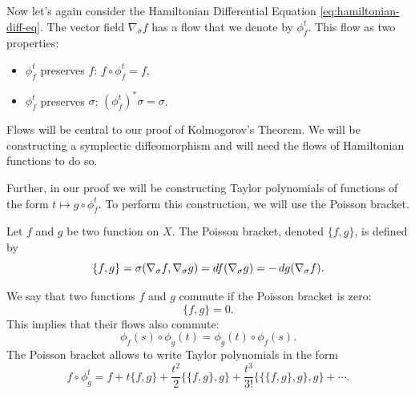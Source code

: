 \documentclass[twoside,letterpaper,10pt]{article}
\newcommand{\sgrad}{\nabla_{\sigma}}
\begin{document}
Now let's again consider the Hamiltonian Differential Equation
\cref{eq:hamiltonian-diff-eq}.
The vector field $\sgrad f$ has a flow that we denote by $\phi_f^t$.
This flow as two properties:
\begin{itemize}
\item $\phi_f^t$ preserves $f$: $f \circ \phi_f^t = f$,
\item $\phi_f^t$ preserves $\sigma$: $(\phi_f^t)^* \sigma = \sigma$.
\end{itemize}
Flows will be central to our proof of Kolmogorov's Theorem.
We will be constructing a symplectic diffeomorphism and will need the flows of
Hamiltonian functions to do so.

Further, in our proof we will be constructing Taylor polynomials of functions of
the form $t \mapsto g \circ \phi_f^t$.
To perform this construction, we will use the Poisson bracket.
\begin{defn}
  Let $f$ and $g$ be two function on $X$.
  The Poisson bracket, denoted $\{f, g\}$, is defined by
  \begin{equation*}
    \{f, g\} = \sigma(\sgrad f, \sgrad g) = \dif f(\sgrad g) = - \dif g(\sgrad
 f).
  \end{equation*}
\end{defn}
We say that two functions $f$ and $g$ commute if the Poisson bracket is zero:
\begin{equation*}
  \{f, g\} = 0.
\end{equation*}
This implies that their flows also commute:
\begin{equation*}
  \phi_f(s) \circ \phi_g(t) = \phi_g(t) \circ \phi_f(s).
\end{equation*}
The Poisson bracket allows to write Taylor polynomials in the form
\begin{equation*}
  f \circ \phi_g^t = f + t\{f, g\} + \frac{t^2}{2} \{\{f, g\}, g\} +
  \frac{t^3}{3!} \{ \{ \{f, g\}, g\}, g\} + \cdots.
\end{equation*}
\end{document}
